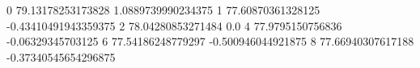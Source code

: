 0 79.13178253173828 1.0889739990234375
1 77.60870361328125 -0.43410491943359375
2 78.04280853271484 0.0
4 77.9795150756836 -0.06329345703125
6 77.54186248779297 -0.500946044921875
8 77.66940307617188 -0.37340545654296875
